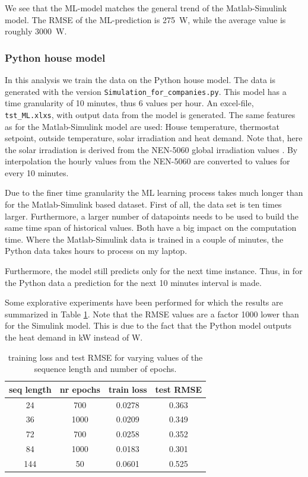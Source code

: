 We see that the ML-model matches the general trend of the Matlab-Simulink model. The RMSE of the ML-prediction is 275~W, while the average value is roughly 3000~W. 


\subsubsection{Python house model}
In this analysis we train the data on the Python house model. The data is generated with the version \texttt{Simulation\_for\_companies.py}. This model has a time granularity of 10 minutes, thus 6 values per hour. An excel-file, \texttt{tst\_ML.xlxs}, with output data from the model is generated. The same features as for the Matlab-Simulink model are used: House temperature, thermostat setpoint, outside temperature, solar irradiation and heat demand. Note that, here the solar irradiation is derived from the NEN-5060 global irradiation values \cite{NEN5060}. By interpolation the hourly values from the NEN-5060 are converted to values for every 10 minutes.  

Due to the finer time granularity the ML learning process takes much longer than for the Matlab-Simulink based dataset. First of all, the data set is ten times larger. Furthermore, a larger number of datapoints needs to be used to build the same time span of historical values. Both have a big impact on the computation time. Where the Matlab-Simulink data is trained in a couple of minutes, the Python data takes hours to process on my laptop. 

Furthermore, the model still predicts only for the next time instance. Thus, in for the Python data a prediction for the next 10 minutes interval is made.  

Some explorative experiments have been performed for which the results are summarized in Table \ref{tab:results_python}. Note that the RMSE values are a factor 1000 lower than for the Simulink model. This is due to the fact that the Python model outputs the heat demand in kW instead of W. 

\begin{table}[H]
	\centering
		\begin{tabular}{c|c|c|c}
				\hline
					seq length & nr epochs & train loss & test RMSE  \\
				\hline
				\hline
					24 & 700 & 0.0278 & 0.363 \\
					36 & 1000 & 0.0209	& 0.349 \\
					72 & 700 & 0.0258	& 0.352 \\
					84 & 1000 & 0.0183 & 0.301\\
					144 & 50 & 0.0601 & 0.525\\
					\hline
		\end{tabular}
	\caption{training loss and test RMSE for varying values of the sequence length and number of epochs. }
	\label{tab:results_python}
\end{table}
 

